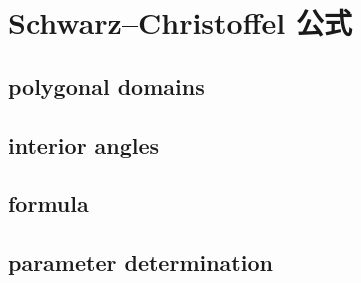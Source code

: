 \section{Schwarz–Christoffel 公式}
\label{b3:sec:0703}


\subsection{polygonal domains}
\label{b3:subsec:070301}

\subsection{interior angles}
\label{b3:subsec:070302}

\subsection{formula}
\label{b3:subsec:070303}

\subsection{parameter determination}
\label{b3:subsec:070304}


